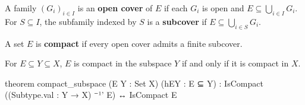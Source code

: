 \begin{definition}
  \label{ma:def:open-cover}
  A family $(G_i)_{i\in I}$ is an \textbf{open cover} of $E$ if each $G_i$ is open and
  $E\subseteq\bigcup_{i\in I}G_i$.
  For $S\subseteq I$, the subfamily indexed by $S$ is a \textbf{subcover} if
  $E\subseteq\bigcup_{i\in S}G_i$.
\end{definition}

\begin{definition}
  \label{ma:def:compact}
  A set $E$ is \textbf{compact} if every open cover admits a finite subcover.
\end{definition}

\begin{proposition}
  \label{ma:thm:compactness-preserved-under-subspace}
  For $E\subseteq Y\subseteq X$, $E$ is compact in the subspace $Y$ if and only if it is compact
  in $X$.

  \begin{lean}
    theorem compact_subspace (E Y : Set X) (hEY : E ⊆ Y) :
        IsCompact ((Subtype.val : Y → X) ⁻¹' E) ↔ IsCompact E
  \end{lean}
\end{proposition}

